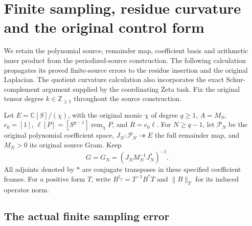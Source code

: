\section{Finite sampling, residue curvature and the original control form}
\label{sec:periodized-curvature-control}

We retain the polynomial source, remainder map, coefficient basis and
arithmetic inner product from the periodized-source construction. The
following calculation propagates its proved finite-source errors to the
residue insertion and the original Laplacian. The quotient curvature
calculation also incorporates the exact Schur-complement argument supplied
by the coordinating Zeta task. Fix the original tensor degree
$k\in\mathbb Z_{\ge1}$ throughout the source construction.

Let $E=\mathbb C[S]/(\chi)$, with the original monic $\chi$ of degree
$q\ge1$, $A=M_S$, $e_0=[1]$, $\ell[P]=[S^{q-1}]\operatorname{rem}_\chi P$,
and $R=e_0\ell$. For $N\ge q-1$, let $\mathcal P_N$ be the original
polynomial coefficient space, $J_N:\mathcal P_N\twoheadrightarrow E$
the full remainder map, and $M_N>0$ its original source Gram. Keep
\[
 G=G_N=(J_NM_N^{-1}J_N^*)^{-1}.
 \tag{FC1}
\]
All adjoints denoted by $*$ are conjugate transposes in these specified
coefficient frames. For a positive form $T$, write
$B^{\dagger_T}=T^{-1}B^*T$ and $\|B\|_T$ for its induced operator norm.

\subsection{The actual finite sampling error}

